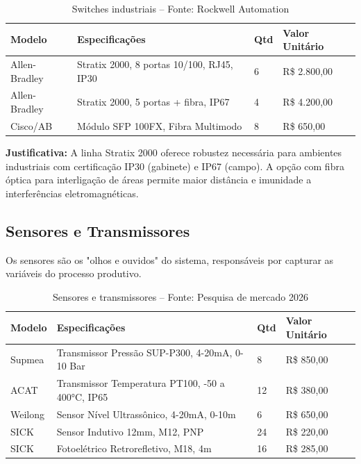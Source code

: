 \documentclass[12pt,a4paper]{article}
\begin{document}
\begin{table}[h]
\centering
\begin{tabular}{@{}p{3cm}|p{5cm}|p{2cm}|p{3cm}@{}}
\toprule
\textbf{Modelo} & \textbf{Especificações} & \textbf{Qtd} & \textbf{Valor Unitário} \\
\midrule
Allen-Bradley & Stratix 2000, 8 portas 10/100, RJ45, IP30 & 6 & R\$ 2.800,00 \\
\midrule
Allen-Bradley & Stratix 2000, 5 portas + fibra, IP67 & 4 & R\$ 4.200,00 \\
\midrule
Cisco/AB & Módulo SFP 100FX, Fibra Multimodo & 8 & R\$ 650,00 \\
\bottomrule
\end{tabular}
\caption{Switches industriais -- Fonte: Rockwell Automation}
\end{table}

\textbf{Justificativa:} A linha Stratix 2000 oferece robustez necessária para ambientes industriais com certificação IP30 (gabinete) e IP67 (campo). A opção com fibra óptica para interligação de áreas permite maior distância e imunidade a interferências eletromagnéticas.

\subsection{Sensores e Transmissores}

Os sensores são os "olhos e ouvidos" do sistema, responsáveis por capturar as variáveis do processo produtivo.

\begin{table}[h]
\centering
\begin{tabular}{@{}p{3cm}|p{5cm}|p{2cm}|p{3cm}@{}}
\toprule
\textbf{Modelo} & \textbf{Especificações} & \textbf{Qtd} & \textbf{Valor Unitário} \\
\midrule
Supmea & Transmissor Pressão SUP-P300, 4-20mA, 0-10 Bar & 8 & R\$ 850,00 \\
\midrule
ACAT & Transmissor Temperatura PT100, -50 a 400°C, IP65 & 12 & R\$ 380,00 \\
\midrule
Weilong & Sensor Nível Ultrassônico, 4-20mA, 0-10m & 6 & R\$ 650,00 \\
\midrule
SICK & Sensor Indutivo 12mm, M12, PNP & 24 & R\$ 220,00 \\
\midrule
SICK & Fotoelétrico Retrorefletivo, M18, 4m & 16 & R\$ 285,00 \\
\bottomrule
\end{tabular}
\caption{Sensores e transmissores -- Fonte: Pesquisa de mercado 2026}
\end{table}
\end{document}

